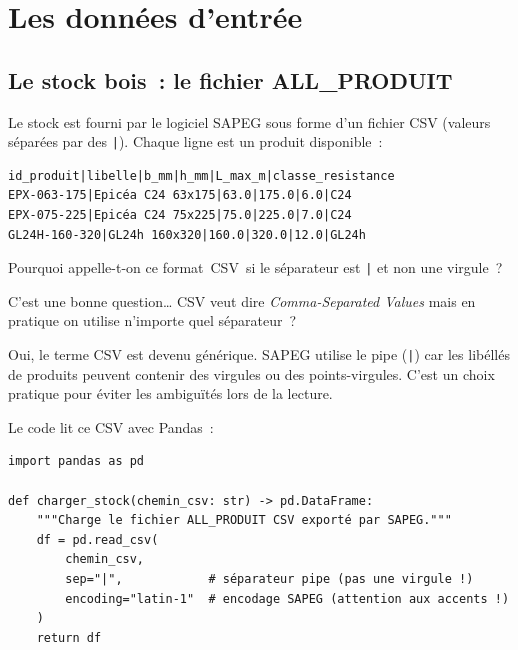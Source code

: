 \documentclass[12pt, a4paper, openany]{book}
\newcommand{\py}[1]{\texttt{#1}}
\newcommand{\fichier}[1]{\texttt{\textit{#1}}}
\begin{document}
\chapter{Les donn\'ees d'entr\'ee}

\section{Le stock bois~: le fichier ALL\_PRODUIT}

Le stock est fourni par le logiciel SAPEG sous forme d'un fichier CSV
(valeurs s\'epar\'ees par des \py{|}). Chaque ligne est un produit disponible~:

\begin{lstlisting}[style=toml, language={}, caption={Exemple de lignes du fichier ALL\_PRODUIT}]
id_produit|libelle|b_mm|h_mm|L_max_m|classe_resistance
EPX-063-175|Epicéa C24 63x175|63.0|175.0|6.0|C24
EPX-075-225|Epicéa C24 75x225|75.0|225.0|7.0|C24
GL24H-160-320|GL24h 160x320|160.0|320.0|12.0|GL24h
\end{lstlisting}

\begin{maitre}
Pourquoi appelle-t-on ce format \guillemotleft\,CSV\,\guillemotright{}
si le s\'eparateur est \py{|} et non une virgule~?
\end{maitre}

\begin{apprenti}
C'est une bonne question\ldots{} CSV veut dire
\emph{Comma-Separated Values} mais en pratique on utilise
n'importe quel s\'eparateur~?
\end{apprenti}

\begin{maitre}
Oui, le terme CSV est devenu g\'en\'erique. SAPEG utilise le pipe
(\py{|}) car les lib\'ell\'es de produits peuvent contenir des virgules
ou des points-virgules. C'est un choix pratique pour \'eviter les
ambigu\"it\'es lors de la lecture.
\end{maitre}

Le code lit ce CSV avec Pandas~:

\begin{lstlisting}[style=python, caption={Lecture du stock CSV --- extrait de \fichier{sapeg\_regen\_stock/chargeur.py}}]
import pandas as pd

def charger_stock(chemin_csv: str) -> pd.DataFrame:
    """Charge le fichier ALL_PRODUIT CSV exporté par SAPEG."""
    df = pd.read_csv(
        chemin_csv,
        sep="|",            # séparateur pipe (pas une virgule !)
        encoding="latin-1"  # encodage SAPEG (attention aux accents !)
    )
    return df
\end{lstlisting}
\end{document}
